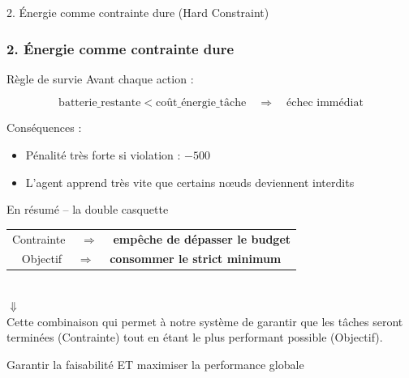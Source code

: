 \documentclass[10pt,aspectratio=169]{beamer}
\begin{document}
\begin{frame}{2. Énergie comme contrainte dure (Hard Constraint)}
\frametitle{2. Énergie comme contrainte dure}

\begin{block}{Règle de survie}
Avant chaque action :

\[ \text{batterie\_restante} < \text{coût\_énergie\_tâche} \quad \Longrightarrow \quad \text{échec immédiat} \]
\end{block}

\bigskip
Conséquences :
\begin{itemize}
    \item Pénalité très forte si violation : \alert{$-500$}
    \item L’agent apprend très vite que certains nœuds deviennent \alert{interdits}
\end{itemize}
\end{frame}

\begin{frame}{En résumé – la double casquette}
\centering
\Large
\begin{tabular}{c}
\alert{Contrainte} $\quad\Longrightarrow\quad$ \textbf{empêche de dépasser le budget } \\[0.8em]
\alert{Objectif}   $\quad\Longrightarrow\quad$ \textbf{consommer le strict minimum}
\end{tabular}

\\[1.2em]
\large$\Downarrow$ \\[0.6em]
\centering
{Cette combinaison qui permet à notre système de garantir que les tâches seront terminées (Contrainte) tout en étant le plus performant possible (Objectif).}


\bigskip
\Large Garantir la \alert{faisabilité} \quad ET \quad maximiser la \alert{performance globale}
\end{frame}
\end{document}
